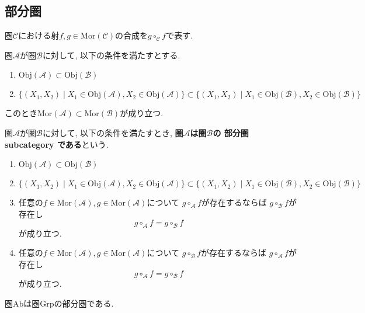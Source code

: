 \subsection{部分圏}
\begin{Notation}
圏$\mathscr{C}$における射$f,g\in\mathrm{Mor}(\mathscr{C})$の合成を$g\circ_{\mathscr{C}}f$で表す.
\end{Notation}
\begin{Prop}
圏$\mathscr{A}$が圏$\mathscr{B}$に対して, 以下の条件を満たすとする.
\begin{enumerate}
\item
$\mathrm{Obj}(\mathscr{A})\subset\mathrm{Obj}(\mathscr{B})$
\item
$\{(X_1,X_2)\mid X_1\in\mathrm{Obj}(\mathscr{A}),X_2\in \mathrm{Obj}(\mathscr{A})\}
\subset
\{(X_1,X_2)\mid X_1\in\mathrm{Obj}(\mathscr{B}),X_2\in \mathrm{Obj}(\mathscr{B})\}
$
\end{enumerate}
このとき$\mathrm{Mor}(\mathscr{A})\subset\mathrm{Mor}(\mathscr{B})$が成り立つ.
\end{Prop}

\begin{Def}
圏$\mathscr{A}$が圏$\mathscr{B}$に対して, 以下の条件を満たすとき, {\bf 圏$\mathscr{A}$は圏$\mathscr{B}$の
部分圏 subcategory
である}という.
\begin{enumerate}
\item
$\mathrm{Obj}(\mathscr{A})\subset\mathrm{Obj}(\mathscr{B})$
\item
$\{(X_1,X_2)\mid X_1\in\mathrm{Obj}(\mathscr{A}),X_2\in \mathrm{Obj}(\mathscr{A})\}
\subset
\{(X_1,X_2)\mid X_1\in\mathrm{Obj}(\mathscr{B}),X_2\in \mathrm{Obj}(\mathscr{B})\}
$
\item 任意の$f\in\mathrm{Mor}(\mathscr{A}), g\in\mathrm{Mor}(\mathscr{A})$について
$g\circ_{\mathscr{A}}f$が存在するならば
$g\circ_{\mathscr{B}}f$が存在し
\[
g\circ_{\mathscr{A}}f=g\circ_{\mathscr{B}}f
\]
が成り立つ.
\item 任意の$f\in\mathrm{Mor}(\mathscr{A}), g\in\mathrm{Mor}(\mathscr{A})$について
$g\circ_{\mathscr{B}}f$が存在するならば
$g\circ_{\mathscr{A}}f$が存在し
\[
g\circ_{\mathscr{A}}f=g\circ_{\mathscr{B}}f
\]
が成り立つ.
\end{enumerate}
\end{Def}
\begin{Prop}\label{Prop:Ab subcategory Grp}
圏$\mathrm{Ab}$は圏$\mathrm{Grp}$の部分圏である.
\end{Prop}
\begin{comment}
\begin{proof}
\end{proof}
\end{comment}

